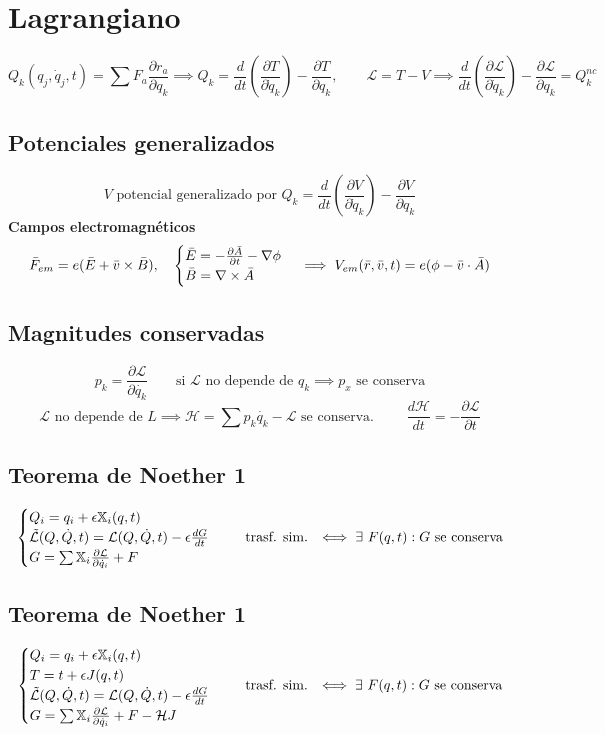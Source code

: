 \documentclass{myclass}
\newcommand{\1}{\tikz[baseline=(char.base)]{
            \node[shape=circle,draw,inner sep=1pt] (char) {1};}}
\newcommand{\2}{\tikz[baseline=(char.base)]{
            \node[shape=circle,draw,inner sep=1pt] (char) {2};}}
\newcommand{\X}{\mathbb{X}}
\newcommand{\dt}{\frac{d}{dt}}
\renewcommand{\L}{\mathcal{L}}
\renewcommand{\H}{\mathcal{H}}
\begin{document}
\section{Lagrangiano}
$$
Q_k(q_j, \dot q_j, t) = \sum F_a \frac{\partial r_a}{\partial q_k} \implies Q_k = \dt\left(\frac{\partial T}{\partial \dot q_k}\right) -\frac{\partial T}{\partial q_k}, \qquad \L = T-V \implies \dt\left(\frac{\partial \L}{\partial \dot q_k}\right) - \frac{\partial \L}{\partial q_k} = Q_k^{nc}
$$
\subsection{Potenciales generalizados}
$$
V \text{ potencial generalizado por } Q_k = \frac{d}{dt}\left( \frac{\partial V}{\partial \dot{q}_k} \right) - \frac{\partial V}{\partial q_k}
$$
\textbf{Campos electromagnéticos}\\
$$
\Bar{F}_{em} = e(\Bar{E}+ \Bar{v}\times \Bar{B}), \quad \begin{cases}
\Bar{E} = -\frac{\partial \Bar{A}}{\partial t} - \nabla \phi \\
\Bar{B} = \nabla \times \Bar{A}
\end{cases} \implies V_{em}(\Bar{r}, \Bar{v}, t) = e(\phi - \Bar{v}\cdot \Bar{A})
$$

\subsection{Magnitudes conservadas}
$$
p_k = \frac{\partial \L}{\partial \dot{q_k}} \qquad \text{si } \L \text{ no depende de } q_k \implies p_x \text{ se conserva} 
$$
$$
\L \text{ no depende de } L \implies \H = \sum p_k\dot{q_k} - \L \text{ se conserva. } \qquad \frac{d \H}{dt}  = -\frac{\partial \L}{\partial t}
$$
\subsection{Teorema de Noether 1}
$$
\begin{cases}
Q_i = q_i + \epsilon \X_i(q, t) \\
\Tilde{\L}(Q, \dot{Q}, t) = \L(Q, \dot{Q}, t) - \epsilon \frac{dG}{dt} \\
G = \sum \X_i \frac{\partial \L}{\partial \dot{q}_i} + F
\end{cases} \quad
\text{ trasf. sim. } \iff \exists \ F(q, t) : G \text{ se conserva}
$$
\subsection{Teorema de Noether 1}
$$
\begin{cases}
Q_i = q_i + \epsilon \X_i(q, t) \\
T = t + \epsilon J(q, t) \\
\Tilde{\L}(Q, \dot{Q}, t) = \L(Q, \dot{Q}, t) - \epsilon \frac{dG}{dt} \\
G = \sum \X_i \frac{\partial \L}{\partial \dot{q}_i} + F - \H J
\end{cases} \quad
\text{ trasf. sim. } \iff \exists \ F(q, t) : G \text{ se conserva}
$$
 
\end{document}
